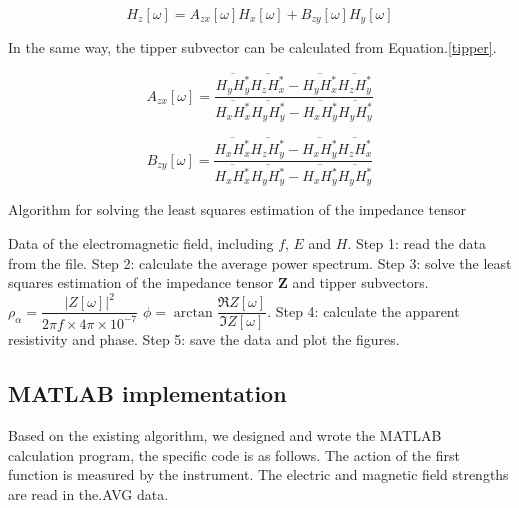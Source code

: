 \documentclass[9pt,a4paper,twoside]{rho-class/rho}
\begin{document}
\begin{equation}
    \label{tipper}
    H_z[\omega]=A_{zx}[\omega]H_x[\omega]+B_{zy}[\omega]H_y[\omega]
\end{equation}

In the same way, the tipper subvector can be calculated from Equation.\eqref{tipper}.

\begin{equation}
    \label{azx}
    A_{zx}[\omega]=\dfrac{\overline{H_yH_y^\ast}\overline{H_zH_x^\ast}-\overline{H_yH_x^\ast}\overline{H_zH_y^\ast}}{\overline{H_xH_x^\ast}\overline{H_yH_y^\ast}-\overline{H_xH_y^\ast}\overline{H_yH_y^\ast}}
\end{equation}

\begin{equation}
    \label{bzy}
    B_{zy}[\omega]=\dfrac{\overline{H_xH_x^\ast}\overline{H_zH_y^\ast}-\overline{H_xH_y^\ast}\overline{H_zH_x^\ast}}{\overline{H_xH_x^\ast}\overline{H_yH_y^\ast}-\overline{H_xH_y^\ast}\overline{H_yH_y^\ast}}
\end{equation}

\begin{algorithm}[H]
    \caption{Algorithm for solving the least squares estimation of the impedance tensor}
    \label{alg:z}
    \begin{algorithmic}[1]
        \Require Data of the electromagnetic field, including $f$, $E$ and $H$.
        \State Step 1: read the data from the file.
        \State Step 2: calculate the average power spectrum.
        \State Step 3: solve the least squares estimation of the impedance tensor $\mathbf{Z}$ and tipper subvectors.
        \State $\rho_\alpha=\dfrac{|Z[\omega]|^2}{2\pi f\times 4\pi\times 10^{-7}}$
        \State $\phi=\arctan\dfrac{\mathfrak{R}Z[\omega]}{\mathfrak{I}Z[\omega]}$.
        \State Step 4: calculate the apparent resistivity and phase.
        \State Step 5: save the data and plot the figures.
    \end{algorithmic}
\end{algorithm}

\subsection{MATLAB implementation}

Based on the existing algorithm, we designed and wrote the MATLAB calculation program, the specific code is as follows. The action of the first function is measured by the instrument. The electric and magnetic field strengths are read in the.AVG data.
\end{document}
